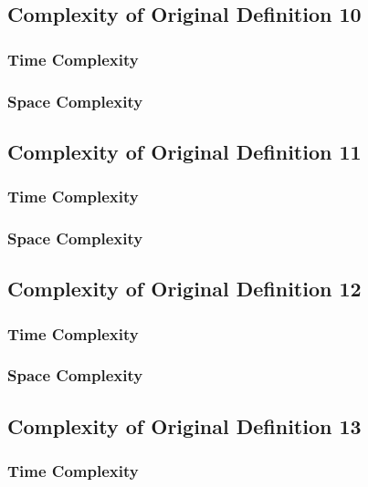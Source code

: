 \documentclass[conference]{IEEEtran}
\begin{document}
\subsection{Complexity of Original Definition 10}

\subsubsection{Time Complexity}

\subsubsection{Space Complexity}

\subsection{Complexity of Original Definition 11}

\subsubsection{Time Complexity}

\subsubsection{Space Complexity}

\subsection{Complexity of Original Definition 12}

\subsubsection{Time Complexity}

\subsubsection{Space Complexity}

\subsection{Complexity of Original Definition 13}

\subsubsection{Time Complexity}
\end{document}
